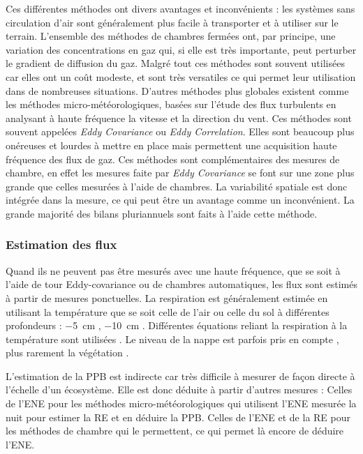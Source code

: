 Ces différentes méthodes ont divers avantages et inconvénients : les systèmes sans circulation d'air sont généralement plus facile à transporter et à utiliser sur le terrain.
L'ensemble des méthodes de chambres fermées ont, par principe, une variation des concentrations en gaz qui, si elle est très importante, peut perturber le gradient de diffusion du gaz.
Malgré tout ces méthodes sont souvent utilisées car elles ont un coût modeste, et sont très versatiles ce qui permet leur utilisation dans de nombreuses situations.
D'autres méthodes plus globales existent comme les méthodes micro-météorologiques, basées sur l'étude des flux turbulents en analysant à haute fréquence la vitesse et la direction du vent.
Ces méthodes sont souvent appelées \textit{Eddy Covariance} ou \textit{Eddy Correlation}.
Elles sont beaucoup plus onéreuses et lourdes à mettre en place mais permettent une acquisition haute fréquence des flux de gaz.
Ces méthodes sont complémentaires des mesures de chambre, en effet les mesures faite par \textit{Eddy Covariance} se font sur une zone plus grande que celles mesurées à l'aide de chambres.
La variabilité spatiale est donc intégrée dans la mesure, ce qui peut être un avantage comme un inconvénient.
La grande majorité des bilans pluriannuels sont faits à l'aide cette méthode.

\subsubsection{Estimation des flux}
Quand ils ne peuvent pas être mesurés avec une haute fréquence, que se soit à l'aide de tour Eddy-covariance ou de chambres automatiques, les flux sont estimés à partir de mesures ponctuelles.
La respiration est généralement estimée en utilisant la température que se soit celle de l'air \citep{bortoluzzi2006a} ou celle du sol à différentes profondeurs : \SI{-5}{\centi\metre} \citep{gorres2014,ballantyne2014}, \SI{-10}{\centi\metre} \cite{kim1992,zhu2015}.
Différentes équations reliant la respiration à la température sont utilisées \citep{fang2001}.
Le niveau de la nappe est parfois pris en compte \citep{strack2013,munir2015}, plus rarement la végétation \citep{bortoluzzi2006a,karki2015}.

L'estimation de la PPB est indirecte car très difficile à mesurer de façon directe à l'échelle d'un écosystème.
Elle est donc déduite à partir d'autres mesures :
Celles de l'ENE pour les méthodes micro-météorologiques qui utilisent l'ENE mesurée la nuit pour estimer la RE et en déduire la PPB.
Celles de l'ENE et de la RE pour les méthodes de chambre qui le permettent, ce qui permet là encore de déduire l'ENE.

